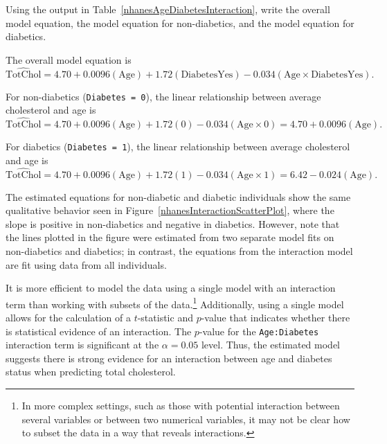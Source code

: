 \begin{example}{Using the output in Table~\ref{nhanesAgeDiabetesInteraction}, write the overall model equation, the model equation for non-diabetics, and the model equation for diabetics.}
	
	The overall model equation is 
	\[\widehat{\text{TotChol}} = 4.70 + 0.0096(\text{Age}) + 1.72(\text{DiabetesYes})
	- 0.034(\text{Age} \times \text{DiabetesYes}). \]
	
	For non-diabetics (\texttt{Diabetes = 0}), the linear relationship between average cholesterol and age is
	\[\widehat{\text{TotChol}} = 4.70 + 0.0096(\text{Age}) + 1.72(0)
	- 0.034(\text{Age} \times 0) = 4.70 + 0.0096(\text{Age}).\]
	
	For diabetics (\texttt{Diabetes = 1}), the linear relationship between average cholesterol and age is
	\[\widehat{\text{TotChol}} = 4.70 + 0.0096(\text{Age}) + 1.72(1)
	- 0.034(\text{Age} \times 1) = 6.42 - 0.024(\text{Age}). \]
\end{example}

The estimated equations for non-diabetic and diabetic individuals show the same qualitative behavior seen in Figure~\ref{nhanesInteractionScatterPlot}, where the slope is positive in non-diabetics and negative in diabetics. However, note that the lines plotted in the figure were estimated from two separate model fits on non-diabetics and diabetics; in contrast, the equations from the interaction model are fit using data from all individuals.

It is more efficient to model the data using a single model with an interaction term than working with subsets of the data.\footnote{In more complex settings, such as those with potential interaction between several variables or between two numerical variables, it may not be clear how to subset the data in a way that reveals interactions.} Additionally, using a single model allows for the calculation of a $t$-statistic and $p$-value that indicates whether there is statistical evidence of an interaction. The $p$-value for the \texttt{Age:Diabetes} interaction term is significant at the $\alpha = 0.05$ level. Thus, the estimated model suggests there is strong evidence for an interaction between age and diabetes status when predicting total cholesterol. 

